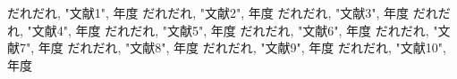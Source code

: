 \documentclass[a4j]{jarticle}
\begin{document}
\newpage
\begin{thebibliography}{99}
だれだれ, "文献1", 年度
だれだれ, "文献2", 年度
だれだれ, "文献3", 年度
だれだれ, "文献4", 年度
だれだれ, "文献5", 年度
だれだれ, "文献6", 年度
だれだれ, "文献7", 年度
だれだれ, "文献8", 年度
だれだれ, "文献9", 年度
だれだれ, "文献10", 年度

\end{thebibliography}
\end{document}
